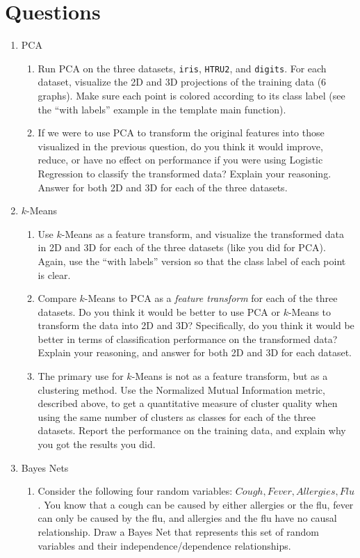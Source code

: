 \documentclass{article}
\begin{document}
\section*{Questions}
\begin{enumerate}
	\item PCA
	\begin{enumerate}
		\item Run PCA on the three datasets, \texttt{iris}, \texttt{HTRU2}, and \texttt{digits}. For each dataset, visualize the 2D and 3D projections of the training data (6 graphs). Make sure each point is colored according to its class label (see the ``with labels'' example in the template main function).
		\item If we were to use PCA to transform the original features into those visualized in the previous question, do you think it would improve, reduce, or have no effect on performance if you were using Logistic Regression to classify the transformed data? Explain your reasoning. Answer for both 2D and 3D for each of the three datasets.
	\end{enumerate}
	\item \(k\)-Means
	\begin{enumerate}
		\item Use \(k\)-Means as a feature transform, and visualize the transformed data in 2D and 3D for each of the three datasets (like you did for PCA). Again, use the ``with labels'' version so that the class label of each point is clear.
		\item Compare \(k\)-Means to PCA as a \emph{feature transform} for each of the three datasets. Do you think it would be better to use PCA or \(k\)-Means to transform the data into 2D and 3D? Specifically, do you think it would be better in terms of classification performance on the transformed data? Explain your reasoning, and answer for both 2D and 3D for each dataset.
		\item The primary use for \(k\)-Means is not as a feature transform, but as a clustering method. Use the Normalized Mutual Information metric, described above, to get a quantitative measure of cluster quality when using the same number of clusters as classes for each of the three datasets. Report the performance on the training data, and explain why you got the results you did.
	\end{enumerate}
	\item Bayes Nets
	\begin{enumerate}
		\item Consider the following four random variables: \(Cough, Fever, Allergies, Flu\). You know that a cough can be caused by either allergies or the flu, fever can only be caused by the flu, and allergies and the flu have no causal relationship. Draw a Bayes Net that represents this set of random variables and their independence/dependence relationships.

\end{enumerate}
\end{enumerate}
\end{document}
